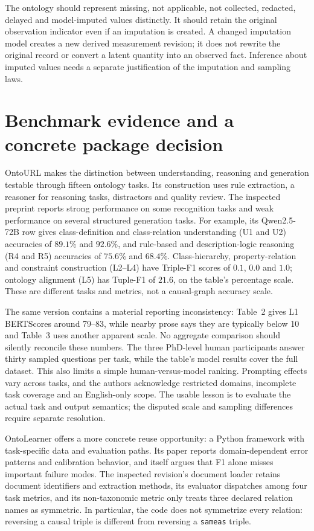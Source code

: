 The ontology should represent missing, not applicable, not collected,
redacted, delayed and model-imputed values distinctly. It should retain the
original observation indicator even if an imputation is created. A changed
imputation model creates a new derived measurement revision; it does not
rewrite the original record or convert a latent quantity into an observed
fact. Inference about imputed values needs a separate justification of the
imputation and sampling laws.

\section{Benchmark evidence and a concrete package decision}

OntoURL makes the distinction between understanding, reasoning and generation
testable through fifteen ontology tasks. Its construction uses rule
extraction, a reasoner for reasoning tasks, distractors and quality review.
The inspected preprint reports strong performance on some recognition tasks
and weak performance on several structured generation tasks. For example,
its Qwen2.5-72B row gives class-definition and class-relation understanding
(U1 and U2) accuracies of \(89.1\%\) and \(92.6\%\), and rule-based and
description-logic reasoning (R4 and R5) accuracies of \(75.6\%\) and \(68.4\%\).
Class-hierarchy, property-relation and constraint construction (L2--L4) have
Triple-F1 scores of \(0.1\), \(0.0\) and \(1.0\); ontology alignment (L5)
has Tuple-F1 of \(21.6\), on the table's percentage scale.
These are different tasks and metrics, not a causal-graph accuracy
scale.\citep{exec17_ontology_ontourl}

The same version contains a material reporting inconsistency: Table~2 gives
L1 BERTScores around 79--83, while nearby prose says they are typically below
10 and Table~3 uses another apparent scale. No aggregate comparison should
silently reconcile these numbers. The three PhD-level human participants
answer thirty sampled questions per task, while the table's model results
cover the full dataset. This also limits a simple human-versus-model
ranking. Prompting effects vary across tasks, and the authors acknowledge
restricted domains, incomplete task coverage and an English-only scope.
The usable lesson is to evaluate the actual task and output semantics;
the disputed scale and sampling differences require separate resolution.

OntoLearner offers a more concrete reuse opportunity: a Python framework
with task-specific data and evaluation paths. Its paper reports
domain-dependent error patterns and calibration behavior, and itself argues
that F1 alone misses important failure modes.\citep{v12_la_2607_01977}
The inspected revision's document loader retains document identifiers and
extraction methods, its evaluator dispatches among four task metrics, and
its non-taxonomic metric only treats three declared relation names as
symmetric. In particular, the code does not symmetrize every relation:
reversing a causal triple is different from reversing a
\texttt{sameas} triple.\citep{exec17_ontology_sources}

